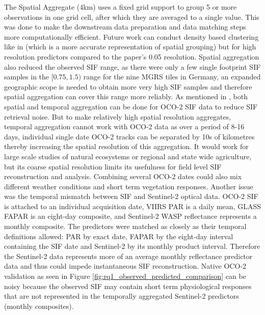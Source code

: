 The Spatial Aggregate (4km) uses a fixed grid support to group 5 or more observations in one grid cell, after which they are averaged to a single value. This was done to make the downstream data preparation and data matching steps more computationally efficient. Future work can conduct density based clustering like in \cite{yu2019high} (which is a more accurate representation of spatial grouping) but for high resolution predictors compared to the paper's 0.05 resolution. Spatial aggregation also reduced the observed SIF range, as there were only a few single footprint SIF samples in the $[0.75,1.5)$ range for the nine MGRS tiles in Germany, an expanded geographic scope is needed to obtain more very high SIF samples and therefore spatial aggregation can cover this range more reliably. As mentioned in \cite{doughty2022global}, both spatial and temporal aggregation can be done for OCO-2 SIF data to reduce SIF retrieval noise. But to make relatively high spatial resolution aggregates, temporal aggregation cannot work with OCO-2 data as over a period of 8-16 days, individual single date OCO-2 tracks can be separated by 10s of kilometres thereby increasing the spatial resolution of this aggregation. It would work for large scale studies of natural ecosystems or regional and state wide agriculture, but its coarse spatial resolution limits its usefulness for field level SIF reconstruction and analysis. Combining several OCO-2 dates could also mix different weather conditions and short term vegetation responses. Another issue was the temporal mismatch between SIF and Sentinel-2 optical data. OCO-2 SIF is attached to an individual acquisition date, VIIRS PAR is a daily mean, GLASS FAPAR is an eight-day composite, and Sentinel-2 WASP reflectance represents a monthly composite. The predictors were matched as closely as their temporal definitions allowed: PAR by exact date, FAPAR by the eight-day interval containing the SIF date and Sentinel-2 by its monthly product interval. Therefore the Sentinel-2 data represents more of an average monthly reflectance predictor data and thus could impede instantaneous SIF reconstruction. Native OCO-2 validation as seen in Figure \ref{fig:rq1_observed_predicted_comparison} can be noisy because the observed SIF may contain short term physiological responses that are not represented in the temporally aggregated Sentinel-2 predictors (monthly composites). 

